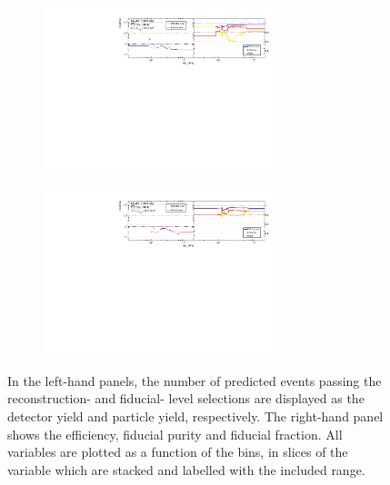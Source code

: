 \begin{figure}[htb]
\begin{subfigure}{.99\textwidth}
    \end{subfigure}
    \begin{subfigure}{.99\textwidth}\centering
        \includegraphics[width = 0.75\textwidth]{Figures/m4l/UnfoldingStudies/v014_inputs/m4l_pt4l50-100inputs.pdf}
    \end{subfigure}
    \begin{subfigure}{.99\textwidth}\centering
        \includegraphics[width = 0.75\textwidth]{Figures/m4l/UnfoldingStudies/v014_inputs/m4l_pt4l100-600inputs.pdf}
    \end{subfigure}   
    \caption{In the left-hand panels, the number of predicted events passing the reconstruction- and fiducial- level selections are displayed as the detector yield and particle yield, respectively. The right-hand panel shows the efficiency, fiducial purity and fiducial fraction. All variables are plotted as a function of the \mFourL bins, in slices of the \ptFourL variable which are stacked and labelled with the included \ptFourL range.
    \label{fig:pt4lunf}}
\end{figure}  

\FloatBarrier
\clearpage

